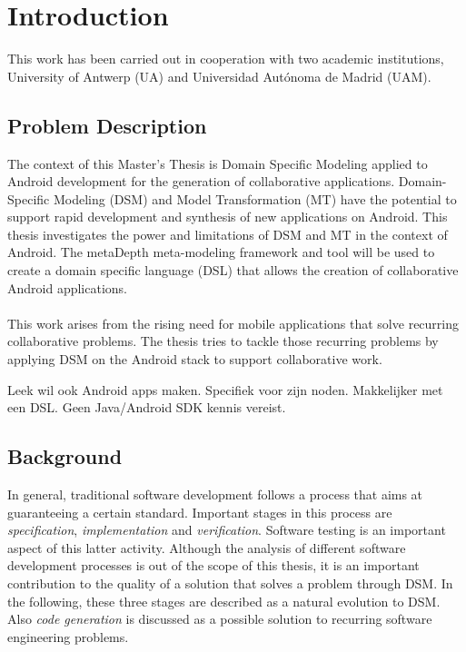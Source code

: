 \chapter{Introduction}

This work has been carried out in cooperation with two academic institutions, University of Antwerp (UA) and Universidad Aut\'onoma de Madrid (UAM).

\section{Problem Description}

The context of this Master's Thesis is Domain Specific Modeling applied to Android development for the generation of collaborative applications. Domain-Specific Modeling (DSM) and Model Transformation (MT) have the potential to support rapid development and synthesis of new applications on Android. This thesis investigates the power and limitations of DSM and MT in the context of Android. The metaDepth meta-modeling framework and tool will be used to create a domain specific language (DSL) that allows the creation of collaborative Android applications.
\\ \\
This work arises from the rising need for mobile applications that solve recurring collaborative problems. The thesis tries to tackle those recurring problems by applying DSM on the Android stack to support collaborative work.

Leek wil ook Android apps maken. Specifiek voor zijn noden. Makkelijker met een DSL. Geen Java/Android SDK kennis vereist.

\section{Background}

In general, traditional software development follows a process that aims at guaranteeing a certain standard. Important stages in this process are \textit{specification}, \textit{implementation} and \textit{verification}. Software testing is an important aspect of this latter activity. Although the analysis of different software development processes is out of the scope of this thesis, it is an important contribution to the quality of a solution that solves a problem through DSM. In the following, these three stages are described as a natural evolution to DSM. Also \textit{code generation} is discussed as a possible solution to recurring software engineering problems.

